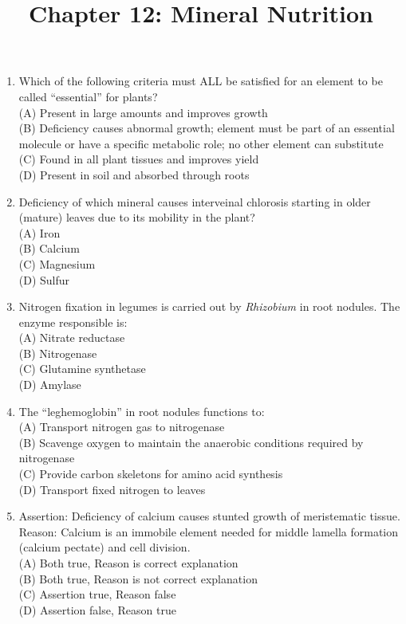 \documentclass{article}
\begin{document}
\title{Chapter 12: Mineral Nutrition}
\date{}
\maketitle

\begin{enumerate}[label=Q\arabic*.]

\item Which of the following criteria must ALL be satisfied for an element to be called ``essential'' for plants?
\\(A) Present in large amounts and improves growth
\\(B) Deficiency causes abnormal growth; element must be part of an essential molecule or have a specific metabolic role; no other element can substitute
\\(C) Found in all plant tissues and improves yield
\\(D) Present in soil and absorbed through roots

\item Deficiency of which mineral causes interveinal chlorosis starting in older (mature) leaves due to its mobility in the plant?
\\(A) Iron
\\(B) Calcium
\\(C) Magnesium
\\(D) Sulfur

\item Nitrogen fixation in legumes is carried out by \textit{Rhizobium} in root nodules. The enzyme responsible is:
\\(A) Nitrate reductase
\\(B) Nitrogenase
\\(C) Glutamine synthetase
\\(D) Amylase

\item The ``leghemoglobin'' in root nodules functions to:
\\(A) Transport nitrogen gas to nitrogenase
\\(B) Scavenge oxygen to maintain the anaerobic conditions required by nitrogenase
\\(C) Provide carbon skeletons for amino acid synthesis
\\(D) Transport fixed nitrogen to leaves

\item Assertion: Deficiency of calcium causes stunted growth of meristematic tissue.\\
Reason: Calcium is an immobile element needed for middle lamella formation (calcium pectate) and cell division.
\\(A) Both true, Reason is correct explanation
\\(B) Both true, Reason is not correct explanation
\\(C) Assertion true, Reason false
\\(D) Assertion false, Reason true


\end{enumerate}
\end{document}
